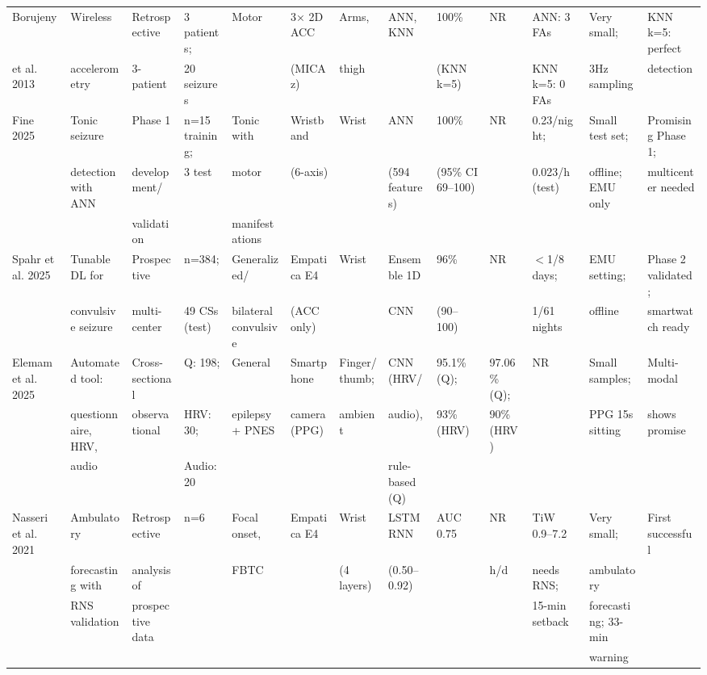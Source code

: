 \documentclass[10pt,a4paper]{article}
\begin{document}
\begin{longtable}{p{2.5cm}p{2cm}p{2cm}p{1.8cm}p{2cm}p{2cm}p{1.2cm}p{2.5cm}p{1.5cm}p{1.5cm}p{1.5cm}p{2cm}p{2.5cm}}
Borujeny & Wireless & Retrospective & 3 patients; & Motor & 3× 2D ACC & Arms, & ANN, KNN & 100\% & NR & ANN: 3 FAs & Very small; & KNN k=5: perfect \\[2pt]
et al. 2013 & accelerometry & 3-patient & 20 seizures & & (MICAz) & thigh & & (KNN k=5) & & KNN k=5: 0 FAs & 3Hz sampling & detection \\[6pt]

Fine 2025 & Tonic seizure & Phase 1 & n=15 training; & Tonic with & Wristband & Wrist & ANN & 100\% & NR & 0.23/night; & Small test set; & Promising Phase 1; \\[2pt]
& detection with ANN & development/ & 3 test & motor & (6-axis) & & (594 features) & (95\% CI 69--100) & & 0.023/h (test) & offline; EMU only & multicenter needed \\[2pt]
& & validation & & manifestations & & & & & & & \\[6pt]

Spahr et al. 2025 & Tunable DL for & Prospective & n=384; & Generalized/ & Empatica E4 & Wrist & Ensemble 1D & 96\% & NR & $<$1/8 days; & EMU setting; & Phase 2 validated; \\[2pt]
& convulsive seizure & multi-center & 49 CSs (test) & bilateral convulsive & (ACC only) & & CNN & (90--100) & & 1/61 nights & offline & smartwatch ready \\[6pt]

Elemam et al. 2025 & Automated tool: & Cross-sectional & Q: 198; & General & Smartphone & Finger/thumb; & CNN (HRV/ & 95.1\% (Q); & 97.06\% (Q); & NR & Small samples; & Multi-modal \\[2pt]
& questionnaire, HRV, & observational & HRV: 30; & epilepsy + PNES & camera (PPG) & ambient & audio), & 93\% (HRV) & 90\% (HRV) & & PPG 15s sitting & shows promise \\[2pt]
& audio & & Audio: 20 & & & & rule-based (Q) & & & & \\[6pt]

Nasseri et al. 2021 & Ambulatory & Retrospective & n=6 & Focal onset, & Empatica E4 & Wrist & LSTM RNN & AUC 0.75 & NR & TiW 0.9--7.2 & Very small; & First successful \\[2pt]
& forecasting with & analysis of & & FBTC & & (4 layers) & (0.50--0.92) & & h/d & needs RNS; & ambulatory \\[2pt]
& RNS validation & prospective data & & & & & & & & 15-min setback & forecasting; 33-min \\[2pt]
& & & & & & & & & & & warning \\[6pt]


\end{longtable}
\end{document}
